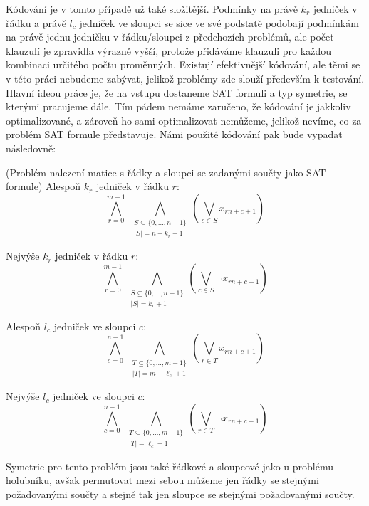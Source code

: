 Kódování je v tomto případě už také složitější. Podmínky na právě $k_r$ jedniček v řádku a právě $l_c$ jedniček ve sloupci se sice ve své podstatě podobají podmínkám na právě jednu jedničku v řádku/sloupci z předchozích problémů, ale počet klauzulí je zpravidla výrazně vyšší, protože přidáváme klauzuli pro každou kombinaci určitého počtu proměnných. Existují efektivnější kódování, ale těmi se v této práci nebudeme zabývat, jelikož problémy zde slouží především k testování. Hlavní ideou práce je, že na vstupu dostaneme SAT formuli a typ symetrie, se kterými pracujeme dále. Tím pádem nemáme zaručeno, že kódování je jakkoliv optimalizované, a zároveň ho sami optimalizovat nemůžeme, jelikož nevíme, co za problém SAT formule představuje. Námi použité kódování pak bude vypadat následovně:

\begin{pozn}{(Problém nalezení matice s řádky a sloupci se zadanými součty jako SAT formule)}
Alespoň $k_r$ jedniček v řádku $r$: 
\[
\bigwedge_{r=0}^{m-1}
\;
\bigwedge_{\substack{
S \subseteq \{0,\dots,n-1\}\\
|S|=n-k_r+1
}}
\left(
\bigvee_{c \in S}
x_{rn+c+1}
\right)
\]

Nejvýše $k_r$ jedniček v řádku $r$:
\[
\bigwedge_{r=0}^{m-1}
\;
\bigwedge_{\substack{
S \subseteq \{0,\dots,n-1\}\\
|S|=k_r+1
}}
\left(
\bigvee_{c \in S}
\neg x_{rn+c+1}
\right)
\]

Alespoň $l_c$ jedniček ve sloupci $c$:
\[
\bigwedge_{c=0}^{n-1}
\;
\bigwedge_{\substack{
T \subseteq \{0,\dots,m-1\}\\
|T|=m-\ell_c+1
}}
\left(
\bigvee_{r \in T}
x_{rn+c+1}
\right)
\]

Nejvýše $l_c$ jedniček ve sloupci $c$:
\[
\bigwedge_{c=0}^{n-1}
\;
\bigwedge_{\substack{
T \subseteq \{0,\dots,m-1\}\\
|T|=\ell_c+1
}}
\left(
\bigvee_{r \in T}
\neg x_{rn+c+1}
\right)
\]
\end{pozn}

Symetrie pro tento problém jsou také řádkové a sloupcové jako u problému holubníku, avšak permutovat mezi sebou můžeme jen řádky se stejnými požadovanými součty a stejně tak jen sloupce se stejnými požadovanými součty.

